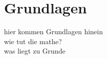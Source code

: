\chapter{Grundlagen}
\begin{Spacing}{\mylinespace}
hier kommen Grundlagen hinein\\
wie tut die mathe?\\
was liegt zu Grunde\\
\end{Spacing}
\newpage
\clearpage
